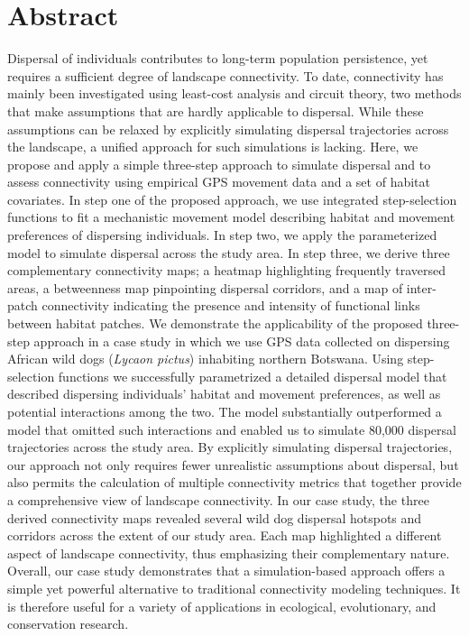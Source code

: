 \documentclass[../FinalThesis.tex]{subfiles}
\begin{document}
\section*{Abstract}
Dispersal of individuals contributes to long-term population persistence, yet
requires a sufficient degree of landscape connectivity. To date, connectivity
has mainly been investigated using least-cost analysis and circuit theory, two
methods that make assumptions that are hardly applicable to dispersal. While
these assumptions can be relaxed by explicitly simulating dispersal trajectories
across the landscape, a unified approach for such simulations is lacking. Here,
we propose and apply a simple three-step approach to simulate dispersal and to
assess connectivity using empirical GPS movement data and a set of habitat
covariates. In step one of the proposed approach, we use integrated
step-selection functions to fit a mechanistic movement model describing habitat
and movement preferences of dispersing individuals. In step two, we apply the
parameterized model to simulate dispersal across the study area. In step three,
we derive three complementary connectivity maps; a heatmap highlighting
frequently traversed areas, a betweenness map pinpointing dispersal corridors,
and a map of inter-patch connectivity indicating the presence and intensity of
functional links between habitat patches. We demonstrate the applicability of
the proposed three-step approach in a case study in which we use GPS data
collected on dispersing African wild dogs (\textit{Lycaon pictus}) inhabiting
northern Botswana. Using step-selection functions we successfully parametrized a
detailed dispersal model that described dispersing individuals' habitat and
movement preferences, as well as potential interactions among the two. The model
substantially outperformed a model that omitted such interactions and enabled us
to simulate 80,000 dispersal trajectories across the study area. By explicitly
simulating dispersal trajectories, our approach not only requires fewer
unrealistic assumptions about dispersal, but also permits the calculation of
multiple connectivity metrics that together provide a comprehensive view of
landscape connectivity. In our case study, the three derived connectivity maps
revealed several wild dog dispersal hotspots and corridors across the extent of
our study area. Each map highlighted a different aspect of landscape
connectivity, thus emphasizing their complementary nature. Overall, our case
study demonstrates that a simulation-based approach offers a simple yet powerful
alternative to traditional connectivity modeling techniques. It is therefore
useful for a variety of applications in ecological, evolutionary, and
conservation research.
\end{document}

